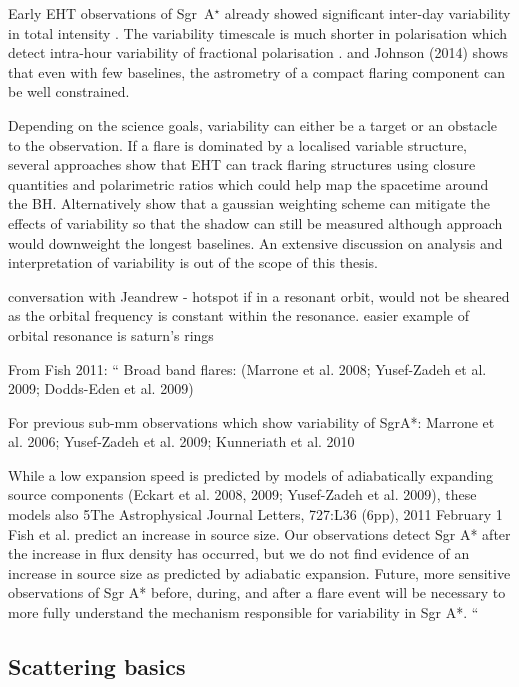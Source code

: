Early EHT observations of Sgr~A$^\star$ already showed significant inter-day variability in total intensity \cite{Fish_2009}. The variability timescale is much shorter in polarisation which detect intra-hour variability of fractional polarisation \cite{Johnson_2015b}.  and  Johnson (2014) shows that even with few baselines, the astrometry of a compact flaring component can be well constrained. 

Depending on the science goals, variability can either be a target or an obstacle to the observation. If a flare is dominated by a localised variable structure, several approaches \citep{Doeleman_2009, Johnson_2014} show that EHT can track flaring structures using closure quantities and polarimetric ratios which could help map the spacetime around the BH. Alternatively \citet{Lu_2016} show that a gaussian weighting scheme can  mitigate the effects of variability so that the shadow can still be measured although approach would downweight the longest baselines. An extensive discussion on analysis and interpretation of variability is out of the scope of this thesis.


conversation with Jeandrew - hotspot if in a resonant orbit, would not be sheared as the orbital frequency is constant within the resonance. easier example of orbital resonance is saturn's rings 

From Fish 2011:
``
Broad band flares:
(Marrone
et al. 2008; Yusef-Zadeh et al. 2009; Dodds-Eden et al. 2009)

For previous sub-mm observations which show variability of SgrA*: 
Marrone et al. 2006; Yusef-Zadeh et al. 2009;
Kunneriath et al. 2010

While a low expansion speed is predicted by
models of adiabatically expanding source components (Eckart
et al. 2008, 2009; Yusef-Zadeh et al. 2009), these models also
5The Astrophysical Journal Letters, 727:L36 (6pp), 2011 February 1
Fish et al.
predict an increase in source size. Our observations detect
Sgr A* after the increase in flux density has occurred, but we do
not find evidence of an increase in source size as predicted by
adiabatic expansion. Future, more sensitive observations of Sgr
A* before, during, and after a flare event will be necessary to
more fully understand the mechanism responsible for variability
in Sgr A*.
``

\subsection{Scattering basics}

